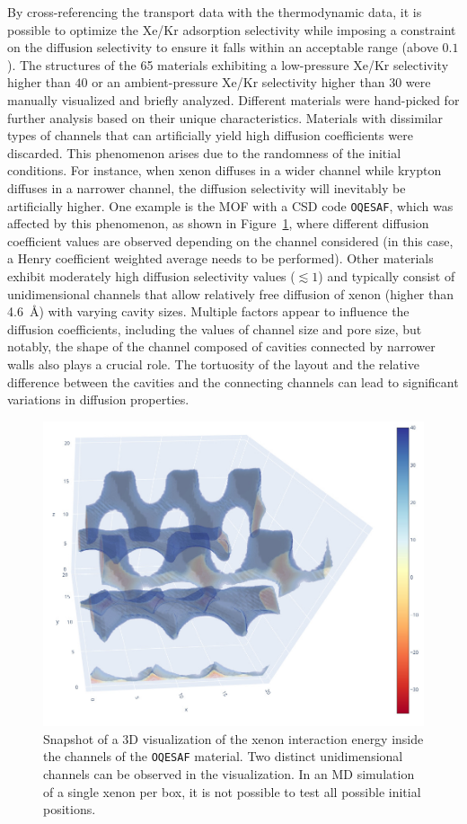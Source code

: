\documentclass[main]{subfiles}
\begin{document}
By cross-referencing the transport data with the thermodynamic data, it is possible to optimize the Xe/Kr adsorption selectivity while imposing a constraint on the diffusion selectivity to ensure it falls within an acceptable range (above $0.1$). The structures of the 65 materials exhibiting a low-pressure Xe/Kr selectivity higher than $40$ or an ambient-pressure Xe/Kr selectivity higher than $30$ were manually visualized and briefly analyzed. Different materials were hand-picked for further analysis based on their unique characteristics. Materials with dissimilar types of channels that can artificially yield high diffusion coefficients were discarded. This phenomenon arises due to the randomness of the initial conditions. For instance, when xenon diffuses in a wider channel while krypton diffuses in a narrower channel, the diffusion selectivity will inevitably be artificially higher. One example is the MOF with a CSD code \texttt{OQESAF}\autocite{Xie_2011}, which was affected by this phenomenon, as shown in Figure~\ref{fgr:OQESAF}, where different diffusion coefficient values are observed depending on the channel considered (in this case, a Henry coefficient weighted average needs to be performed). Other materials exhibit moderately high diffusion selectivity values ($\lesssim 1$) and typically consist of unidimensional channels that allow relatively free diffusion of xenon (higher than \SI{4.6}{\angstrom}) with varying cavity sizes. Multiple factors appear to influence the diffusion coefficients, including the values of channel size and pore size, but notably, the shape of the channel composed of cavities connected by narrower walls also plays a crucial role. The tortuosity of the layout and the relative difference between the cavities and the connecting channels can lead to significant variations in diffusion properties.

\begin{figure}[ht]
  \centering
    \includegraphics[height=0.4\textwidth]{figures/5-diffusion/viz/OQESAF.jpg}
    \caption{Snapshot of a 3D visualization of the xenon interaction energy inside the channels of the \texttt{OQESAF}\autocite{Xie_2011} material. Two distinct unidimensional channels can be observed in the visualization. In an MD simulation of a single xenon per box, it is not possible to test all possible initial positions. }\label{fgr:OQESAF}
\end{figure}
\end{document}
